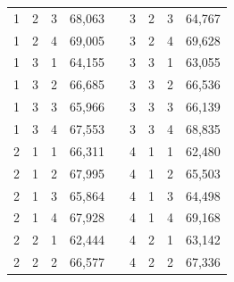 \begin{table}[H]
\begin{tabular}{|c|c|c|c|lc|c|c|c|}
    1 & 2 & 3 & 68,063 & \multicolumn{1}{l|}{} & 3 & 2 & 3 & 64,767 \\ \cline{1-4} \cline{6-9} 
    \cellcolor[HTML]{C0C0C0}1 & \cellcolor[HTML]{C0C0C0}2 & \cellcolor[HTML]{C0C0C0}4 & \cellcolor[HTML]{C0C0C0}69,005 & \multicolumn{1}{l|}{} & \cellcolor[HTML]{C0C0C0}3 & \cellcolor[HTML]{C0C0C0}2 & \cellcolor[HTML]{C0C0C0}4 & \cellcolor[HTML]{C0C0C0}69,628 \\ \cline{1-4} \cline{6-9} 
    1 & 3 & 1 & 64,155 & \multicolumn{1}{l|}{} & 3 & 3 & 1 & 63,055 \\ \cline{1-4} \cline{6-9} 
    \cellcolor[HTML]{C0C0C0}1 & \cellcolor[HTML]{C0C0C0}3 & \cellcolor[HTML]{C0C0C0}2 & \cellcolor[HTML]{C0C0C0}66,685 & \multicolumn{1}{l|}{} & \cellcolor[HTML]{C0C0C0}3 & \cellcolor[HTML]{C0C0C0}3 & \cellcolor[HTML]{C0C0C0}2 & \cellcolor[HTML]{C0C0C0}66,536 \\ \cline{1-4} \cline{6-9} 
    1 & 3 & 3 & 65,966 & \multicolumn{1}{l|}{} & 3 & 3 & 3 & 66,139 \\ \cline{1-4} \cline{6-9} 
    \cellcolor[HTML]{C0C0C0}1 & \cellcolor[HTML]{C0C0C0}3 & \cellcolor[HTML]{C0C0C0}4 & \cellcolor[HTML]{C0C0C0}67,553 & \multicolumn{1}{l|}{} & \cellcolor[HTML]{C0C0C0}3 & \cellcolor[HTML]{C0C0C0}3 & \cellcolor[HTML]{C0C0C0}4 & \cellcolor[HTML]{C0C0C0}68,835 \\ \cline{1-4} \cline{6-9} 
    2 & 1 & 1 & 66,311 & \multicolumn{1}{l|}{} & 4 & 1 & 1 & 62,480 \\ \cline{1-4} \cline{6-9} 
    \cellcolor[HTML]{C0C0C0}2 & \cellcolor[HTML]{C0C0C0}1 & \cellcolor[HTML]{C0C0C0}2 & \cellcolor[HTML]{C0C0C0}67,995 & \multicolumn{1}{l|}{} & \cellcolor[HTML]{C0C0C0}4 & \cellcolor[HTML]{C0C0C0}1 & \cellcolor[HTML]{C0C0C0}2 & \cellcolor[HTML]{C0C0C0}65,503 \\ \cline{1-4} \cline{6-9} 
    2 & 1 & 3 & 65,864 & \multicolumn{1}{l|}{} & 4 & 1 & 3 & 64,498 \\ \cline{1-4} \cline{6-9} 
    \cellcolor[HTML]{C0C0C0}2 & \cellcolor[HTML]{C0C0C0}1 & \cellcolor[HTML]{C0C0C0}4 & \cellcolor[HTML]{C0C0C0}67,928 & \multicolumn{1}{l|}{} & \cellcolor[HTML]{C0C0C0}4 & \cellcolor[HTML]{C0C0C0}1 & \cellcolor[HTML]{C0C0C0}4 & \cellcolor[HTML]{C0C0C0}69,168 \\ \cline{1-4} \cline{6-9} 
    2 & 2 & 1 & 62,444 & \multicolumn{1}{l|}{} & 4 & 2 & 1 & 63,142 \\ \cline{1-4} \cline{6-9} 
    \cellcolor[HTML]{C0C0C0}2 & \cellcolor[HTML]{C0C0C0}2 & \cellcolor[HTML]{C0C0C0}2 & \cellcolor[HTML]{C0C0C0}66,577 & \multicolumn{1}{l|}{} & \cellcolor[HTML]{C0C0C0}4 & \cellcolor[HTML]{C0C0C0}2 & \cellcolor[HTML]{C0C0C0}2 & \cellcolor[HTML]{C0C0C0}67,336 \\ \cline{1-4} \cline{6-9} 

\end{tabular}
\end{table}
